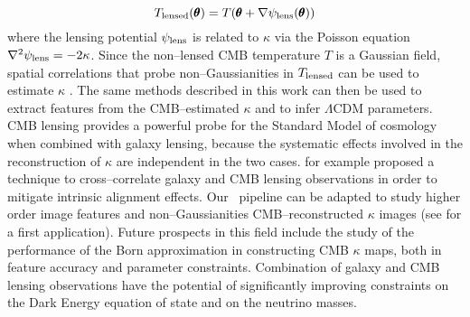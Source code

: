 \begin{equation}
\label{eq:8:tlens}
T_{\rm lensed}(\pmb{\theta}) = T(\pmb{\theta} + \nabla \psi_{\rm lens}(\pmb{\theta}))
\end{equation} 
%
where the lensing potential $\psi_{\rm lens}$ is related to $\kappa$ via the Poisson equation $\nabla^2\psi_{\rm lens}=-2\kappa$. Since the non--lensed CMB temperature $T$ is a Gaussian field, spatial correlations that probe non--Gaussianities in $T_{\rm lensed}$ can be used to estimate $\kappa$ \citep{CMBLens,HuCMBLens}. The same methods described in this work can then be used to extract features from the CMB--estimated $\kappa$ and to infer $\Lambda$CDM parameters. CMB lensing provides a powerful probe for the Standard Model of cosmology when combined with galaxy lensing, because the systematic effects involved in the reconstruction of $\kappa$ are independent in the two cases. \citep{CMBIA} for example proposed a technique to cross--correlate galaxy and CMB lensing observations in order to mitigate intrinsic alignment effects. Our \LT\, pipeline can be adapted to study higher order image features and non--Gaussianities CMB--reconstructed $\kappa$ images (see \citep{PetriCMB} for a first application). Future prospects in this field include the study of the performance of the Born approximation in constructing CMB $\kappa$ maps, both in feature accuracy \citep{CMBCalabrese,CMBPrattenLewis} and parameter constraints. Combination of galaxy and CMB lensing observations have the potential of significantly improving constraints on the Dark Energy equation of state and on the neutrino masses.   


%